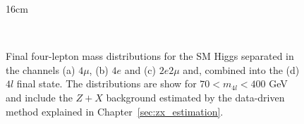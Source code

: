 \begin{figure}[hbtp]{16cm}
	\caption{Final four-lepton mass distributions for the SM Higgs separated in the channels (a) $4\mu$, (b) $4e$ and (c) $2e2\mu$ and, combined into the (d) $4l$ final state. The distributions are show for $70 < m_{4l} < 400$ GeV and include the $Z+X$ background estimated by the data-driven method explained in Chapter~\ref{sec:zx_estimation}.}
	\centering
	\\

\end{figure}
